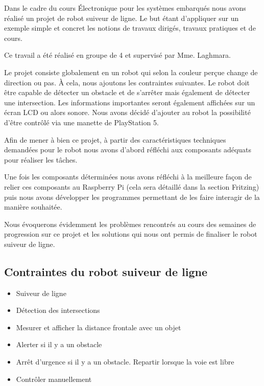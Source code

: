 Dans le cadre du cours Électronique pour les systèmes embarqués nous avons réalisé un projet de robot suiveur de ligne. Le but étant d'appliquer sur un exemple simple et concret les notions de travaux dirigés, travaux pratiques et de cours.

Ce travail a été réalisé en groupe de 4 et supervisé par Mme. Laghmara.

Le projet consiste globalement en un robot qui selon la couleur perçue change de direction ou pas. À cela, nous ajoutons les contraintes suivantes. Le robot doit être capable de détecter un obstacle et de s'arrêter mais également de détecter une intersection. Les informations importantes seront également affichées sur un écran LCD ou alors sonore. Nous avons décidé d'ajouter au robot la possibilité d'être contrôlé via une manette de PlayStation 5.

Afin de mener à bien ce projet, à partir des caractéristiques techniques demandées pour le robot nous avons d'abord réfléchi aux composants adéquats pour réaliser les tâches.

Une fois les composants déterminées nous avons réfléchi à la meilleure façon de relier ces composants au Raspberry Pi (cela sera détaillé dans la section Fritzing) puis nous avons développer les programmes permettant de les faire interagir de la manière souhaitée.

Nous évoquerons évidemment les problèmes rencontrés au cours des semaines de progression sur ce projet et les solutions qui nous ont permis de finaliser le robot suiveur de ligne.

\subsection{Contraintes du robot suiveur de ligne}
\begin{itemize}
    \item Suiveur de ligne
    \item Détection des intersections
    \item Mesurer et afficher la distance frontale avec un objet
    \item Alerter si il y a un obstacle
    \item Arrêt d'urgence si il y a un obstacle. Repartir lorsque la voie est libre
    \item Contrôler manuellement
\end{itemize}